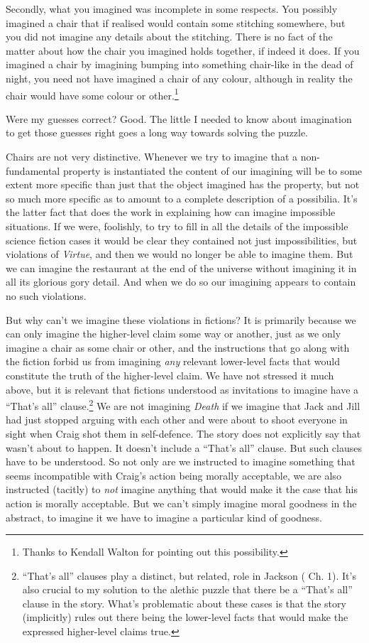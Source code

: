 \documentclass[
  10pt,
  letterpaper,
  DIV=11,
  numbers=noendperiod,
  twoside]{scrartcl}
\begin{document}
Secondly, what you imagined was incomplete in some respects. You
possibly imagined a chair that if realised would contain some stitching
somewhere, but you did not imagine any details about the stitching.
There is no fact of the matter about how the chair you imagined holds
together, if indeed it does. If you imagined a chair by imagining
bumping into something chair-like in the dead of night, you need not
have imagined a chair of any colour, although in reality the chair would
have some colour or other.\footnote{Thanks to Kendall Walton for
  pointing out this possibility.}

Were my guesses correct? Good. The little I needed to know about
imagination to get those guesses right goes a long way towards solving
the puzzle.

Chairs are not very distinctive. Whenever we try to imagine that a
non-fundamental property is instantiated the content of our imagining
will be to some extent more specific than just that the object imagined
has the property, but not so much more specific as to amount to a
complete description of a possibilia. It's the latter fact that does the
work in explaining how can imagine impossible situations. If we were,
foolishly, to try to fill in all the details of the impossible science
fiction cases it would be clear they contained not just impossibilities,
but violations of \emph{Virtue}, and then we would no longer be able to
imagine them. But we can imagine the restaurant at the end of the
universe without imagining it in all its glorious gory detail. And when
we do so our imagining appears to contain no such violations.

But why can't we imagine these violations in fictions? It is primarily
because we can only imagine the higher-level claim some way or another,
just as we only imagine a chair as some chair or other, and the
instructions that go along with the fiction forbid us from imagining
\emph{any} relevant lower-level facts that would constitute the truth of
the higher-level claim. We have not stressed it much above, but it is
relevant that fictions understood as invitations to imagine have a
``That's all'' clause.\footnote{``That's all'' clauses play a distinct,
  but related, role in Jackson ( Ch. 1).
  It's also crucial to my solution to the alethic puzzle that there be a
  ``That's all'' clause in the story. What's problematic about these
  cases is that the story (implicitly) rules out there being the
  lower-level facts that would make the expressed higher-level claims
  true.} We are not imagining \emph{Death} if we imagine that Jack and
Jill had just stopped arguing with each other and were about to shoot
everyone in sight when Craig shot them in self-defence. The story does
not explicitly say that wasn't about to happen. It doesn't include a
``That's all'' clause. But such clauses have to be understood. So not
only are we instructed to imagine something that seems incompatible with
Craig's action being morally acceptable, we are also instructed
(tacitly) to \emph{not} imagine anything that would make it the case
that his action is morally acceptable. But we can't simply imagine moral
goodness in the abstract, to imagine it we have to imagine a particular
kind of goodness.
\end{document}
